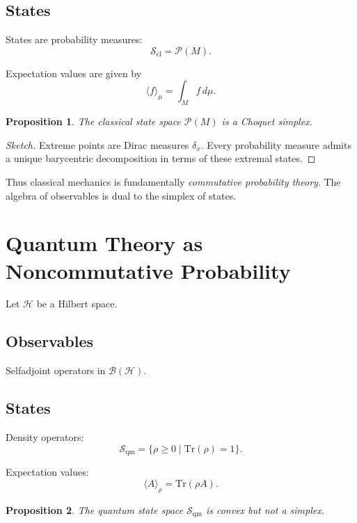 \documentclass[11pt]{article}
\newtheorem{proposition}{Proposition}
\begin{document}
\subsection*{States}
States are probability measures:
\[
\mathcal{S}_{\mathrm{cl}} = \mathcal{P}(M).
\]

Expectation values are given by
\begin{equation}
\langle f \rangle_\mu = \int_M f \, d\mu.
\end{equation}

\begin{proposition}
The classical state space $\mathcal{P}(M)$ is a Choquet simplex.
\end{proposition}

\begin{proof}[Sketch]
Extreme points are Dirac measures $\delta_x$.
Every probability measure admits a unique barycentric decomposition
in terms of these extremal states.
\end{proof}

Thus classical mechanics is fundamentally
\emph{commutative probability theory}.
The algebra of observables is dual to the simplex of states.

\section{Quantum Theory as Noncommutative Probability}

Let $\mathcal{H}$ be a Hilbert space.

\subsection*{Observables}
Selfadjoint operators in $\mathcal{B}(\mathcal{H})$.

\subsection*{States}
Density operators:
\[
\mathcal{S}_{\mathrm{qm}} = 
\{ \rho \ge 0 \mid \mathrm{Tr}(\rho)=1 \}.
\]

Expectation values:
\begin{equation}
\langle A \rangle_\rho = \mathrm{Tr}(\rho A).
\end{equation}

\begin{proposition}
The quantum state space $\mathcal{S}_{\mathrm{qm}}$ is convex but not a simplex.
\end{proposition}
\end{document}
